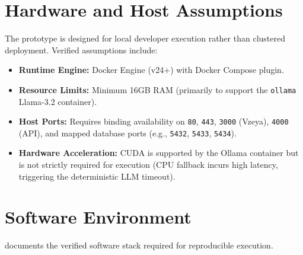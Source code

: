 \section{Hardware and Host Assumptions}
\label{sec:exp-hardware}
The prototype is designed for local developer execution rather than clustered deployment.
Verified assumptions include:
\begin{itemize}
    \item \textbf{Runtime Engine:} Docker Engine (v24+) with Docker Compose plugin.
    \item \textbf{Resource Limits:} Minimum 16GB RAM (primarily to support the \texttt{ollama} Llama-3.2 container).
    \item \textbf{Host Ports:} Requires binding availability on \texttt{80}, \texttt{443}, \texttt{3000} (Vzeya), \texttt{4000} (API), and mapped database ports (e.g., \texttt{5432}, \texttt{5433}, \texttt{5434}).
    \item \textbf{Hardware Acceleration:} CUDA is supported by the Ollama container but is not strictly required for execution (CPU fallback incurs high latency, triggering the deterministic LLM timeout).
\end{itemize}

\section{Software Environment}
\label{sec:exp-software}
 documents the verified software stack required for reproducible execution.

\begin{table}[h]
\centering
{}
\caption{Verified Software Environment Inventory}
\label{tab:software-environment}
\end{table}


